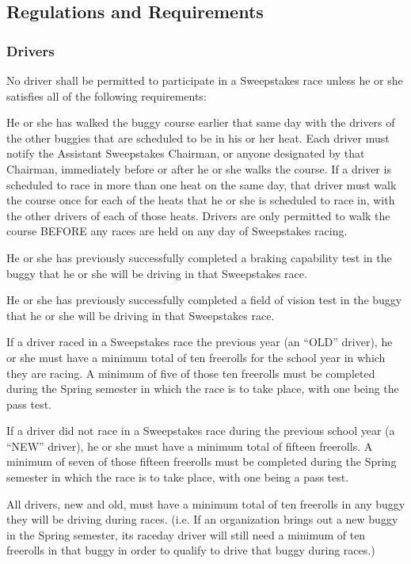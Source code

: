 \subsection{Regulations and Requirements}

\subsubsection{Drivers}

No driver shall be permitted to participate in a Sweepstakes race unless he or she satisfies all of the following requirements:

He or she has walked the buggy course earlier that same day with the drivers of the other buggies that are scheduled to be in his or her heat. Each driver must notify the Assistant Sweepstakes Chairman, or anyone designated by that Chairman, immediately before or after he or she walks the course. If a driver is scheduled to race in more than one heat on the same day, that driver must walk the course once for each of the heats that he or she is scheduled to race in, with the other drivers of each of those heats. Drivers are only permitted to walk the course BEFORE any races are held on any day of Sweepstakes racing.

He or she has previously successfully completed a braking capability test in the buggy that he or she will be driving in that Sweepstakes race.

He or she has previously successfully completed a field of vision test in the buggy that he or she will be driving in that Sweepstakes race.

If a driver raced in a Sweepstakes race the previous year (an ``OLD'' driver), he or she must have a minimum total of ten freerolls for the school year in which they are racing. A minimum of five of those ten freerolls must be completed during the Spring semester in which the race is to take place, with one being the pass test.

If a driver did not race in a Sweepstakes race during the previous school year (a ``NEW'' driver), he or she must have a minimum total of fifteen freerolls. A minimum of seven of those fifteen freerolls must be completed during the Spring semester in which the race is to take place, with one being a pass test.

All drivers, new and old, must have a minimum total of ten freerolls in any buggy they will be driving during races. (i.e. If an organization brings out a new buggy in the Spring semester, its raceday driver will still need a minimum of ten freerolls in that buggy in order to qualify to drive that buggy during races.)


